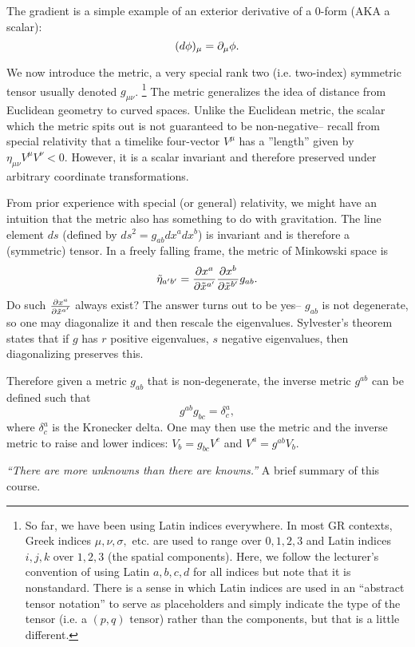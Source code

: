 The gradient is a simple example of an exterior derivative of a 0-form (AKA a scalar):
$$(d\phi)_\mu=\partial_\mu \phi.$$

We now introduce the metric, a very special rank two (i.e. two-index) symmetric tensor usually denoted $g_{\mu\nu}$.%
    \footnote{So far, we have been using Latin indices everywhere. In most GR contexts, Greek indices $\mu,\nu,\sigma,$ etc. are used to range over $0,1,2,3$ and Latin indices $i,j,k$ over $1,2,3$ (the spatial components). Here, we follow the lecturer's convention of using Latin $a,b,c,d$ for all indices but note that it is nonstandard. There is a sense in which Latin indices are used in an ``abstract tensor notation'' to serve as placeholders and simply indicate the type of the tensor (i.e. a $(p,q)$ tensor) rather than the components, but that is a little different.} 
The metric generalizes the idea of distance from Euclidean geometry to curved spaces. Unlike the Euclidean metric, the scalar which the metric spits out is not guaranteed to be non-negative-- recall from special relativity that a timelike four-vector $V^\mu$ has a ''length'' given by $\eta_{\mu\nu} V^\mu V^\nu <0$. However, it is a scalar invariant and therefore preserved under arbitrary coordinate transformations.

From prior experience with special (or general) relativity, we might have an intuition that the metric also has something to do with gravitation. The line element $ds$ (defined by $ds^2 = g_{ab}dx^a dx^b$) is invariant and is therefore a (symmetric) tensor. In a freely falling frame, the metric of Minkowski space is $$\tilde \eta_{a'b'} = \frac{\partial x^a}{\partial\tilde x^{a'}}\frac{\partial x^b}{\partial \tilde x^{b'} }g_{ab}.$$ Do such $\frac{\partial x^a}{\partial\tilde x^{a'}}$ always exist? The answer turns out to be yes-- $g_{ab}$ is not degenerate, so one may diagonalize it and then rescale the eigenvalues. Sylvester's theorem states that if $g$ has $r$ positive eigenvalues, $s$ negative eigenvalues, then diagonalizing preserves this.%

Therefore given a metric $g_{ab}$ that is non-degenerate, the inverse metric $g^{ab}$ can be defined such that 
\begin{equation}
g^{ab}g_{bc}=\delta^a_c,
\end{equation} where $\delta^a_c$ is the Kronecker delta. One may then use the metric and the inverse metric to raise and lower indices:
$V_b=g_{bc}V^c$ and $V^a = g^{ab}V_b$.

\textit{``There are more unknowns than there are knowns.''} A brief summary of this course.